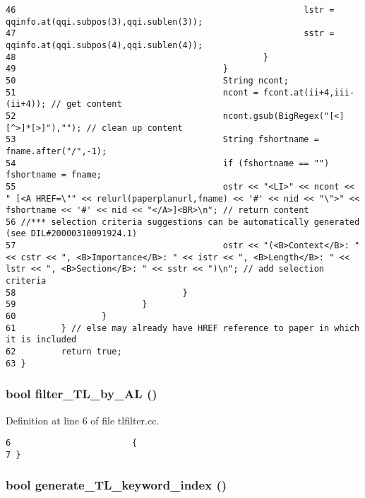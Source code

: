 \begin{verbatim}
46                                                         lstr = qqinfo.at(qqi.subpos(3),qqi.sublen(3));
47                                                         sstr = qqinfo.at(qqi.subpos(4),qqi.sublen(4));
48                                                 }
49                                         }
50                                         String ncont;
51                                         ncont = fcont.at(ii+4,iii-(ii+4)); // get content
52                                         ncont.gsub(BigRegex("[<][^>]*[>]"),""); // clean up content
53                                         String fshortname = fname.after("/",-1);
54                                         if (fshortname == "") fshortname = fname;
55                                         ostr << "<LI>" << ncont << " [<A HREF=\"" << relurl(paperplanurl,fname) << '#' << nid << "\">" << fshortname << '#' << nid << "</A>]<BR>\n"; // return content
56 //*** selection criteria suggestions can be automatically generated (see DIL#20000310091924.1)
57                                         ostr << "(<B>Context</B>: " << cstr << ", <B>Importance</B>: " << istr << ", <B>Length</B>: " << lstr << ", <B>Section</B>: " << sstr << ")\n"; // add selection criteria
58                                 }
59                         }
60                 }
61         } // else may already have HREF reference to paper in which it is included
62         return true;
63 }
\end{verbatim}\normalsize 
{}
\subsubsection{\setlength{\rightskip}{0pt plus 5cm}bool filter\_\-TL\_\-by\_\-AL ()}\label{tlfilter_8cc_a0}




Definition at line 6 of file tlfilter.cc.



\footnotesize\begin{verbatim}6                        {
7 }
\end{verbatim}\normalsize 
{}
\subsubsection{\setlength{\rightskip}{0pt plus 5cm}bool generate\_\-TL\_\-keyword\_\-index ()}\label{tlfilter_8cc_a1}




